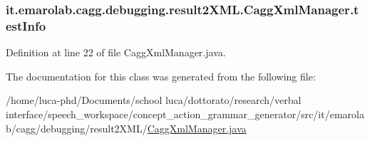 \hypertarget{classit_1_1emarolab_1_1cagg_1_1debugging_1_1result2XML_1_1CaggXmlManager_a948e0f592c4ea1660d89774f630f589e}{
\subsubsection[{test\-Info}]{ it.\-emarolab.\-cagg.\-debugging.\-result2\-X\-M\-L.\-Cagg\-Xml\-Manager.\-test\-Info\hspace{0.3cm}{\ttfamily [private]}}}\label{classit_1_1emarolab_1_1cagg_1_1debugging_1_1result2XML_1_1CaggXmlManager_a948e0f592c4ea1660d89774f630f589e}


Definition at line 22 of file Cagg\-Xml\-Manager.\-java.



The documentation for this class was generated from the following file\-:\begin{DoxyCompactItemize}
\item 
/home/luca-\/phd/\-Documents/school luca/dottorato/research/verbal interface/speech\-\_\-workspace/concept\-\_\-action\-\_\-grammar\-\_\-generator/src/it/emarolab/cagg/debugging/result2\-X\-M\-L/\hyperlink{CaggXmlManager_8java}{Cagg\-Xml\-Manager.\-java}\end{DoxyCompactItemize}
